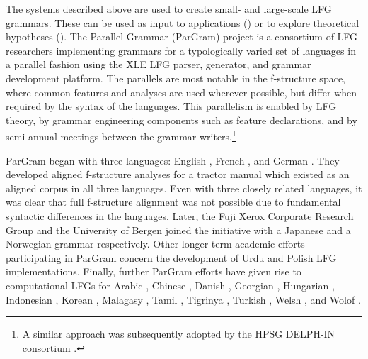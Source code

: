 \documentclass[output=paper,hidelinks]{langscibook}
\begin{document}
%
\label{sec:pargram}

The systems described above are used to create small- and large-scale LFG grammars. These can be used as input to applications () or to explore theoretical hypotheses (). The Parallel Grammar (ParGram) project is a consortium of LFG researchers implementing grammars for a typologically varied set of languages in a parallel fashion \citep{ButtEtAl1999,Butt02KingMasuichiRohrer} using the XLE LFG parser, generator, and grammar development platform. The parallels are most notable in the f-structure space, where common features and analyses are used wherever possible, but differ when required by the syntax of the languages. This parallelism is enabled by LFG theory, by grammar engineering components such as feature declarations, and by semi-annual meetings between the grammar writers.\footnote{A similar approach was subsequently adopted by the HPSG DELPH-IN consortium \citep{benderetal02}.}

ParGram  began with three languages: English \citep{Riezler2002King}, French \citep{Frank:96}, and German \citep{dipper03, rohrerForst2006}. They developed aligned f-structure analyses for a tractor manual which existed as an aligned corpus in all three languages. Even with three closely related languages, it was clear that full f-structure alignment was not possible \citep{Buttetal:99} due to fundamental syntactic differences in the languages. Later, the Fuji Xerox Corporate Research Group and the University of Bergen joined the initiative with a Japanese \citep{Masuichi2003JapanesePO} and a Norwegian grammar \citep{dyvikEtAl2016,dyvikEtAl2019} respectively. Other longer-term academic efforts participating in ParGram concern the development of Urdu \citep{buttking02,buttking07} and Polish \citep{patprz12} LFG implementations. Finally, further ParGram efforts have given rise to computational LFGs for Arabic \citep{attia2006, attia12}, Chinese \citep{Fang-King-GEAF07}, Danish \citep{orsnes2006}, Georgian \citep{meurer09}, Hungarian \citep{laczkorakosi08}, Indonesian \citep{arkaetal09,arka2012}, Korean \citep{kimetal03}, Malagasy \citep{malagasy2006}, Tamil \citep{tamil19}, Tigrinya \citep{amlesomkinfe2011}, Turkish \citep{cetinogluoflazer18}, Welsh \citep{mittendorfsadler06}, and Wolof \citep{Dione:Disambiguation}.
\end{document}
